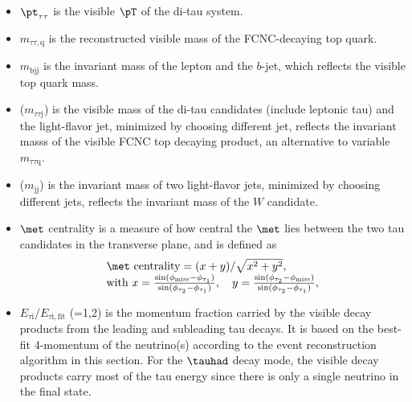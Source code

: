 \begin{itemize}
\item ${\pt}_{\tau\tau}$ is the visible $\pT$ of the di-tau system.
\item $m_{\tau\tau,\text{q}}$ is the reconstructed visible mass of the FCNC-decaying top quark.
\item $m_{\text{bjj}}$ is the invariant mass of the lepton and the $b$-jet, which reflects the visible top quark mass.
\item {}($m_{\tau\tau \text{j}}$) is the visible mass of the di-tau candidates (include leptonic tau) and the light-flavor jet, minimized by choosing different jet, reflects the invariant masss of the visible FCNC top decaying product, an alternative to variable $m_{\tau\tau\text{q}}$.
\item {}($m_{\text{jj}}$) is the invariant mass of two light-flavor jets, minimized by choosing different jets, reflects the invariant mass of the $W$ candidate.
\item $\met$ centrality is a measure of how central the $\met$ lies between the two tau candidates in the transverse plane, and is defined as
\begin{eqnarray}
\begin{array}{l}
\met~\text{centrality} = {(x+y)}/{\sqrt{x^2+y^2}}, \\
\text{with}~x=\frac{\sin(\phi_{\text{miss}}-\phi_{\tau_1})}{\sin(\phi_{\tau_2}-\phi_{\tau_1})}, \quad  y=\frac{\sin(\phi_{\tau_2}-\phi_{\text{miss}})}{\sin(\phi_{\tau_2}-\phi_{\tau_1})} ,
\end{array}
\label{eq:eq3}
\end{eqnarray}
\item $E_{\tau\text{i}}/E_{\tau\text{i},\text{fit}}$ (=1,2) is the momentum fraction carried by the visible decay products from the leading and subleading tau decays. It is based on the best-fit 4-momentum of the neutrino(s) according to the event reconstruction algorithm in this section. For the $\tauhad$ decay mode, the visible decay products carry most of the tau energy since there is only a single neutrino in the final state.%

\end{itemize}
